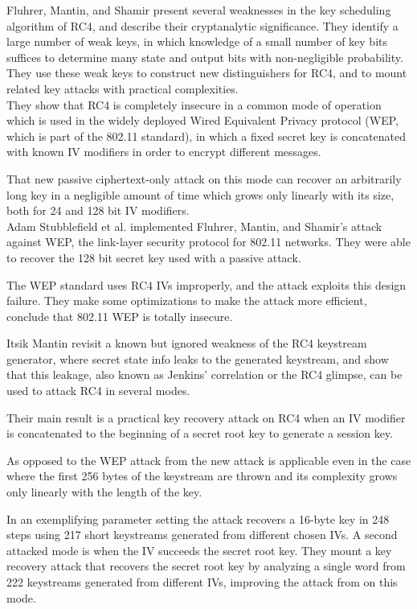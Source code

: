 \documentclass[a4paper,12pt,pagesize,headsepline,bibtotoc,titlepage]{scrartcl}
\begin{document}
Fluhrer, Mantin, and Shamir\cite{fms2002} present several weaknesses in the key scheduling algorithm of RC4, and describe their cryptanalytic significance.
 They identify a large number of weak keys, in which knowledge of a small number of key bits suffices to determine many state and output bits with non-negligible probability. They use these weak keys to construct new distinguishers for RC4, and to mount related key attacks with practical complexities.\\
  They show that RC4 is completely insecure in a common mode of operation which is used in the widely deployed Wired Equivalent Privacy protocol (WEP, which is part of the 802.11 standard), in which a fixed secret key is concatenated with known IV modifiers in order to encrypt different messages. 
  
That new passive ciphertext-only attack on this mode can recover an arbitrarily long key in a negligible amount of time which grows only linearly with its size, both for 24 and
128 bit IV modifiers.\\
Adam Stubblefield et al. implemented Fluhrer, Mantin, and Shamir’s attack \cite{fms2002} against WEP, the link-layer security protocol for 802.11 networks. They were able to recover the 128 bit secret key used with a passive attack. 

The WEP standard uses RC4 IVs improperly, and the attack exploits this design failure. They make some optimizations to make the attack more efficient, conclude that 802.11 WEP is totally insecure.


Itsik Mantin revisit a known but ignored weakness of the RC4 keystream generator, where secret state info leaks to the generated keystream, and show that this leakage, also known as Jenkins’ correlation or the RC4 glimpse, can be used to attack RC4 in several modes. 


Their main result is a practical key recovery attack on RC4 when an IV modifier is concatenated to the beginning of a secret root key to generate a session key. 

As opposed to the WEP attack from \cite{fms2002} the new attack is applicable even in the case where the first 256 bytes of the keystream are thrown and its complexity grows only linearly with the length of the key. 

In an exemplifying parameter setting the attack recovers a 16-byte key in 248 steps using 217 short keystreams generated from different chosen IVs. A second attacked mode is when the IV succeeds the secret root key. They mount a key recovery attack that recovers the secret root key by analyzing a single word from 222 keystreams generated from different IVs, improving the attack from \cite{fms2002} on this mode. 
\end{document}
